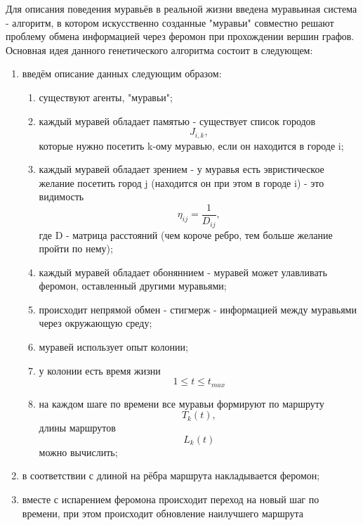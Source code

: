 \documentclass[12pt,a4paper]{scrartcl}
\begin{document}
Для описания поведения муравьёв в реальной жизни введена муравьиная система - алгоритм, в котором искусственно созданные "муравьи" совместно решают проблему обмена информацией через феромон при прохождении вершин графов. Основная идея данного генетического алгоритма состоит в следующем:
\begin{enumerate}
\item введём описание данных следующим образом:
\begin{enumerate}
\item существуют агенты, "муравьи";
\item каждый муравей обладает памятью - существует список городов 
\begin{equation}\label{eq2.1} 
J_{i,k}, 
\end{equation} 
которые нужно посетить k-ому муравью, если он находится в городе i;
\item каждый муравей обладает зрением - у муравья есть эвристическое желание посетить город j (находится он при этом в городе i) - это видимость 
\begin{equation}\label{eq2.2}
η_{ij} = \frac {1} {D_{ij}},
\end{equation}
где D - матрица расстояний (чем короче ребро, тем больше желание пройти по нему);
\item каждый муравей обладает обоняннием - муравей может улавливать феромон, оставленный другими муравьями;
\item происходит непрямой обмен - стигмерж - информацией между муравьями через окружающую среду;
\item муравей использует опыт колонии;
\item у колонии есть время жизни 
\begin{equation}\label{eq2.3}
1 \leqslant t \leqslant t_{max}
\end{equation}
\item на каждом шаге по времени все муравьи формируют по маршруту 
\begin{equation}\label{eq2.4}
T_k(t),
\end{equation}
длины маршрутов
\begin{equation}\label{eq2.5}
L_k(t)
\end{equation}
можно вычислить;
\end{enumerate}
\item в соответствии с длиной на рёбра маршрута накладывается феромон;
\item вместе с испарением феромона происходит переход на новый шаг по времени, при этом происходит обновление наилучшего маршрута

\end{enumerate}
\end{document}
